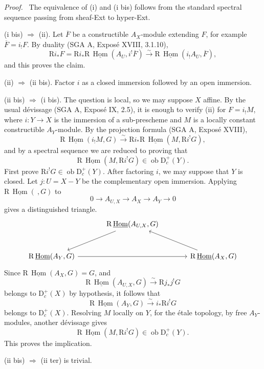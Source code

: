 \documentclass[11pt]{article}
\newenvironment{prooftext}[1][Proof]{\par\noindent\emph{#1.}\ }{\par\medskip}
\DeclareMathOperator{\Hom}{Hom}
\newcommand{\R}{\mathrm{R}}
\newcommand{\D}{\mathrm{D}}
\newcommand{\ob}{\operatorname{ob}}
\newcommand{\ol}[1]{\overline{#1}}
\providecommand{\Hom}{\operatorname{Hom}}
\providecommand{\ob}{\operatorname{ob}}
\providecommand{\R}{\mathrm R}
\providecommand{\Hom}{\operatorname{Hom}}
\begin{document}
\begin{prooftext}
The equivalence of (i) and (i bis) follows from the standard spectral sequence passing from sheaf-Ext to hyper-Ext.

(i bis) $\Rightarrow$ (ii). Let $\ol F$ be a constructible $A_X$-module extending $F$, for example $\ol F=i_!F$. By duality (SGA A, Exposé XVIII, 3.1.10),
\[
   \R i_*F
    =\R i_*\R\,\underline{\Hom}(A_U,i^!\ol F)
    \xrightarrow{\sim}
      \R\,\underline{\Hom}(i_!A_U,\ol F),
\]
and this proves the claim.

(ii) $\Rightarrow$ (ii bis). Factor $i$ as a closed immersion followed by an open immersion.

(ii bis) $\Rightarrow$ (i bis). The question is local, so we may suppose $X$ affine. By the usual dévissage (SGA A, Exposé IX, 2.5), it is enough to verify (ii) for $F=i_!M$, where $i:Y\to X$ is the immersion of a sub-prescheme and $M$ is a locally constant constructible $A_Y$-module. By the projection formula (SGA A, Exposé XVIII),
\[
   \R\,\underline{\Hom}(i_!M,G)
      \xrightarrow{\sim}
   \R i_*\R\,\underline{\Hom}(M,\R i^!G),
\]
and by a spectral sequence we are reduced to proving that
\[
   \R\,\underline{\Hom}(M,\R i^!G)\in\ob\D_c^+(Y).
\]
First prove $\R i^!G\in\ob\D_c^+(Y)$. After factoring $i$, we may suppose that $Y$ is closed. Let $j:U=X-Y$ be the complementary open immersion. Applying $\R\,\underline{\Hom}(\ ,G)$ to
\[
   0\longrightarrow A_{U,X}\longrightarrow A_X\longrightarrow A_Y\longrightarrow0
\]
gives a distinguished triangle.
\[
\begin{tikzcd}[column sep=large,row sep=large]
& \R\,\underline{\Hom}(A_{U,X},G) \arrow[dl] & \\
\R\,\underline{\Hom}(A_Y,G) \arrow[rr] & & \R\,\underline{\Hom}(A_X,G) \arrow[ul]
\end{tikzcd}
\]
Since $\R\,\underline{\Hom}(A_X,G)=G$, and
\[
   \R\,\underline{\Hom}(A_{U,X},G)\xrightarrow{\sim}\R j_*j^!G
\]
belongs to $\D_c^+(X)$ by hypothesis, it follows that
\[
   \R\,\underline{\Hom}(A_Y,G)\xrightarrow{\sim}i_*\R i^!G
\]
belongs to $\D_c^+(X)$. Resolving $M$ locally on $Y$, for the étale topology, by free $A_Y$-modules, another dévissage gives
\[
   \R\,\underline{\Hom}(M,\R i^!G)\in\ob\D_c^+(Y).
\]
This proves the implication.

(ii bis) $\Rightarrow$ (ii ter) is trivial.


\end{prooftext}
\end{document}
